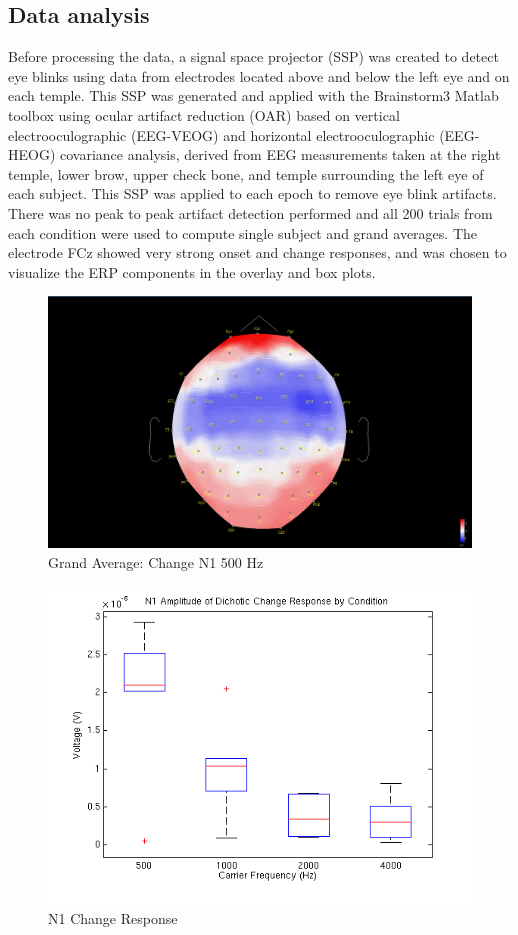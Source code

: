 \documentclass[12pt,journal,compsoc,twocolumn]{IEEEtran}
\begin{document}
\subsection{Data analysis}
Before processing the data, a signal space projector (SSP) was created to detect eye blinks using data from electrodes located above and below the left eye and on each temple. This SSP was generated and applied  with the Brainstorm3 Matlab toolbox \cite{Brainstorm} using ocular artifact reduction (OAR)  based on vertical electrooculographic (EEG-VEOG) and horizontal electrooculographic (EEG-HEOG) covariance analysis, derived from EEG measurements taken at the right temple, lower brow, upper check bone, and temple surrounding the left eye of each subject. This SSP was applied to each epoch to remove eye blink artifacts. There was no peak to peak artifact detection performed and all 200 trials from each condition were used to compute single subject and grand averages. The electrode FCz showed very strong onset and change responses, and was chosen to visualize the ERP components in the overlay and box plots.


\begin{figure}[b]
\centering
\includegraphics[width=3.0 in]{GA_Change_N1_500}
\caption{Grand Average: Change N1 500 Hz}
\label{fig:GA_Change_N1_500}
\end{figure}


\begin{figure}[t]
\centering
\includegraphics[width=3.5 in]{box_dichotic_N1}
\caption{N1 Change Response}
\label{fig:box_dichotic_N1}
\end{figure}
\end{document}
